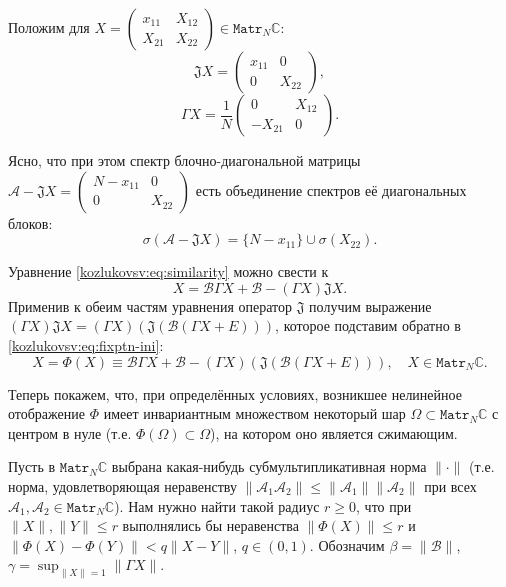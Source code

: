 Положим для \( X =
    \begin{pmatrix}
    x_{11} & X_{12} \\
    X_{21} & X_{22}
    \end{pmatrix} \in \mathtt{Matr}_N\mathbb{C} \):
\[
    \mathfrak{J} X = \begin{pmatrix} x_{11} & 0 \\ 0 & X_{22} \end{pmatrix}, \]
\[
    \Gamma X = \frac{1}{N}\begin{pmatrix} 0 & X_{12} \\ -X_{21} & 0 \end{pmatrix}. \]

Ясно, что при этом спектр блочно-диагональной матрицы
\( \mathcal{A} - \mathfrak{J}X = \begin{pmatrix} N - x_{11} & 0 \\ 0 & X_{22} \end{pmatrix} \)
есть объединение спектров е\"е диагональных блоков:
\[ \sigma(\mathcal{A} - \mathfrak{J} X) = \{ N - x_{11} \} \cup \sigma(X_{22}). \]

Уравнение \eqref{kozlukovsv:eq:similarity} можно свести к
\begin{equation}\label{kozlukovsv:eq:fixptn-ini}
    X = \mathcal{B} \Gamma X + \mathcal{B} - (\Gamma X) \mathfrak{J} X.
\end{equation}
Применив к обеим частям уравнения оператор \( \mathfrak{J} \) получим выражение
 \( (\Gamma X) \mathfrak{J} X = (\Gamma X)(\mathfrak{J}(\mathcal{B} (\Gamma X + E))) \),
 которое подставим обратно в \eqref{kozlukovsv:eq:fixptn-ini}:
\begin{equation}\label{kozlukovsv:eq:fixptn}
    X = \Phi(X) \equiv \mathcal{B} \Gamma X + \mathcal{B} - (\Gamma X)(\mathfrak{J}(\mathcal{B} (\Gamma X + E))), \quad X\in\mathtt{Matr}_N\mathbb{C}.
\end{equation}

Теперь покажем, что, при определ\"енных условиях,
возникшее нелинейное отображение \( \Phi \) имеет инвариантным множеством
некоторый шар \( \Omega \subset \mathtt{Matr}_N\mathbb{C} \) с центром в нуле
(т.е. \( \Phi(\Omega)\subset\Omega \)),
на котором оно является сжимающим.

Пусть в \( \mathtt{Matr}_N\mathbb{C} \)
выбрана какая-нибудь субмультипликативная норма \( \|\cdot\| \)
(т.е. норма, удовлетворяющая неравенству
 \( \| \mathcal{A}_1\mathcal{A}_2 \| \leq \|\mathcal{A}_1\|\|\mathcal{A}_2\| \)
 при всех \( \mathcal{A}_1, \mathcal{A}_2 \in \mathtt{Matr}_N\mathbb{C} \)).
Нам нужно найти такой радиус \( r \geq 0 \),
что при \( \|X\|,\|Y\| \leq r \) выполнялись бы неравенства \( \|\Phi(X)\| \leq r \)
и \( \|\Phi(X) - \Phi(Y)\| < q\|X-Y\| \), \( q\in(0,1) \).
Обозначим
\( \beta = \|\mathcal{B}\| \), \( \gamma = \sup_{\|X\|=1} \|\Gamma X\| \).

